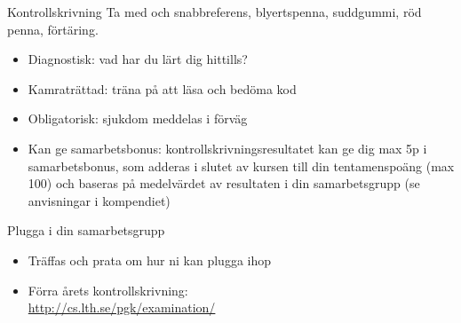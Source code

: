 


\begin{Slide}{Kontrollskrivning}
Ta med  och snabbreferens, blyertspenna, suddgummi, röd penna, förtäring.
\begin{itemize}
  \item Diagnostisk: vad har du lärt dig hittills?
  \item Kamraträttad: träna på att läsa och bedöma kod
  \item Obligatorisk: sjukdom  meddelas i förväg
  \item Kan ge samarbetsbonus: kontrollskrivningsresultatet kan ge dig max 5p i samarbetsbonus, som adderas i slutet av kursen till din tentamenspoäng (max 100) och baseras på medelvärdet av resultaten i din samarbetsgrupp (se anvisningar i kompendiet)
\end{itemize}
\end{Slide}

\begin{Slide}{Plugga i din samarbetsgrupp}
\begin{itemize}
  \item Träffas och prata om hur ni kan plugga ihop
  \item Förra årets kontrollskrivning: \\ \url{http://cs.lth.se/pgk/examination/}

\end{itemize}
\end{Slide}
